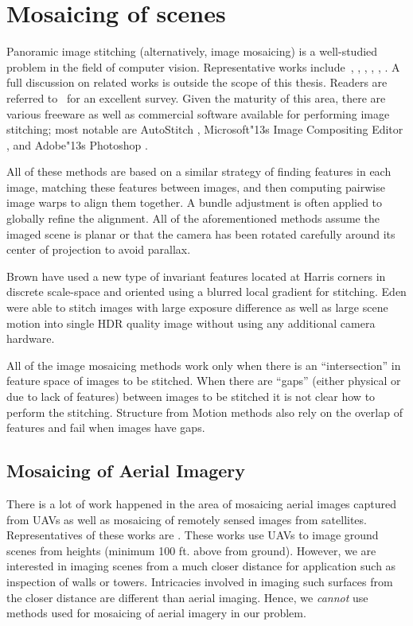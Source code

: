 \section{Mosaicing of scenes}
Panoramic image stitching (alternatively, image mosaicing) is a
well-studied problem in the field of computer vision.  Representative
works include~\cite{Milgram1975}, \cite{Milgram1977}, \cite{Capel},
\cite{Szeliski1997}, \cite{Brown07}, \cite{Brown03}.  A full discussion
on related works is outside the scope of this thesis. Readers are
referred to~\cite{Szeliski05imagealignment} for an excellent survey.
Given the maturity of this area, there are various freeware as well as
commercial software available for performing image stitching; most
notable are AutoStitch \cite{autostitch}, Microsoft\textsc{\char"13}s Image
Compositing Editor \cite{ICE}, and Adobe\textsc{\char"13}s Photoshop
\cite{photoshop}.

All of these methods are based on a similar strategy of finding
features in each image, matching these features between images, and
then computing pairwise image warps to align them together.  A 
bundle adjustment is often applied to globally refine the alignment.
All of the aforementioned methods assume the imaged scene is planar or
that the camera has been rotated carefully around its center of
projection to avoid parallax.

Brown \etal \cite{Brown05} have used a new type of invariant features
located at Harris corners in discrete scale-space and oriented using a
blurred local gradient for stitching. Eden \etal \cite{Eden} were
able to stitch images with large exposure difference as well as large
scene motion into single HDR quality image without using any
additional camera hardware.

All of the image mosaicing methods work only when there is an
``intersection'' in feature space of images to be stitched. When there
are ``gaps'' (either physical or due to lack of features) between
images to be stitched it is not clear how to perform the
stitching. Structure from Motion methods also rely on the overlap of
features and fail when images have gaps.

\subsection{Mosaicing of Aerial Imagery}
There is a lot of work happened in the area of mosaicing aerial images
captured from UAVs as well as mosaicing of remotely sensed images from satellites.
Representatives of these works are \cite{Yue, Yuanhang, Yahyanejad, Zhu}.
These works use UAVs to image ground scenes from heights (minimum 100 ft.
above from ground). However, we are interested in imaging scenes from a much closer
distance for application such as inspection of walls or towers. Intricacies
involved in imaging such surfaces from the closer distance are different than aerial
imaging. Hence, we \textit{cannot} use methods used for mosaicing of aerial 
imagery in our problem.
